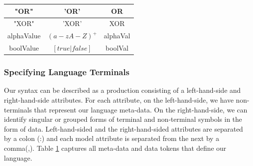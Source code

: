 \documentclass[conference]{IEEEtran}
\begin{document}
\begin{table}[htbp]
\begin{center}
\begin{tabular}{|c|c|c|}
                              "OR" & 'OR' & OR\\ \hline
                              "XOR" & 'XOR' & XOR\\ \hline
                              alphaValue & $(a-zA-Z)^+$ & alphaVal\\ \hline
                              boolValue & $[true | false]$ & boolVal\\ \hline
\end{tabular}
\label{tab:langlex}
\end{center}
\end{table}

\subsubsection{Specifying Language Terminals}
Our syntax can be described as a production consisting of a left-hand-side and right-hand-side attributes. For each attribute, on the left-hand-side, we have non-terminals that represent our language meta-data. On the right-hand-side, we can identify singular or grouped forms of terminal and non-terminal symbols in the form of data. Left-hand-sided and the right-hand-sided attributes are separated by a colon (:) and each model attribute is separated from the next by a comma(,). Table \ref{tab:langlex} captures all meta-data and data tokens that define our language.
\end{document}
